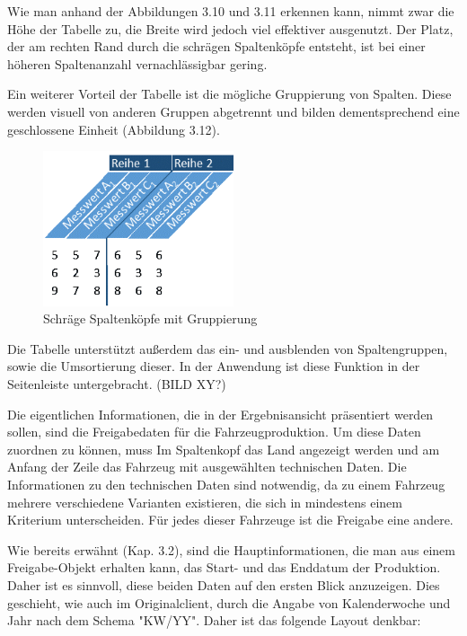 Wie man anhand der Abbildungen 3.10 und 3.11 erkennen kann, nimmt zwar die Höhe der Tabelle zu, die Breite wird jedoch viel effektiver ausgenutzt. Der Platz, der am rechten Rand durch die schrägen Spaltenköpfe entsteht, ist bei einer höheren Spaltenanzahl vernachlässigbar gering.

Ein weiterer Vorteil der Tabelle ist die mögliche Gruppierung von Spalten. Diese werden visuell von anderen Gruppen abgetrennt und bilden dementsprechend eine geschlossene Einheit (Abbildung 3.12).

\begin{figure}[H]
 \centering
 \includegraphics[width=0.5\textwidth]{grafiken/Tabelle_Grouped.png}
 \caption{Schräge Spaltenköpfe mit Gruppierung}
 \label{fig:tabelle2}
\end{figure}

Die Tabelle unterstützt außerdem das ein- und ausblenden von Spaltengruppen, sowie die Umsortierung dieser. In der Anwendung ist diese Funktion in der Seitenleiste untergebracht. (BILD XY?)

Die eigentlichen Informationen, die in der Ergebnisansicht präsentiert werden sollen, sind die Freigabedaten für die Fahrzeugproduktion. Um diese Daten zuordnen zu können, muss Im Spaltenkopf das Land angezeigt werden und am Anfang der Zeile das Fahrzeug mit ausgewählten technischen Daten. Die Informationen zu den technischen Daten sind notwendig, da zu einem Fahrzeug mehrere verschiedene Varianten existieren, die sich in mindestens einem Kriterium unterscheiden. Für jedes dieser Fahrzeuge ist die Freigabe eine andere. 

Wie bereits erwähnt (Kap. 3.2), sind die Hauptinformationen, die man aus einem Freigabe-Objekt erhalten kann, das Start- und das Enddatum der Produktion. Daher ist es sinnvoll, diese beiden Daten auf den ersten Blick anzuzeigen. Dies geschieht, wie auch im Originalclient, durch die Angabe von Kalenderwoche und Jahr nach dem Schema "KW/YY". Daher ist das folgende Layout denkbar:

